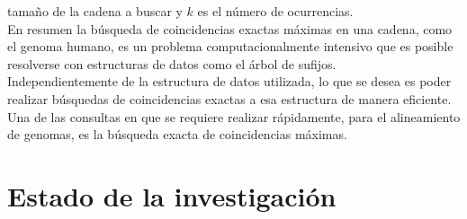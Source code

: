 \documentclass[11pt,a4paper,english]{article}
\begin{document}
tamaño de la cadena a buscar y $k$ es el número de ocurrencias.\\
En resumen la búsqueda de coincidencias exactas máximas en una cadena, como el 
genoma humano, es un problema computacionalmente intensivo que es posible 
resolverse con estructuras de datos como el árbol de sufijos. 
\\Independientemente de la estructura de datos utilizada, lo que se desea es poder
realizar búsquedas de coincidencias exactas a esa estructura de manera eficiente. 
Una de las consultas en que se requiere realizar rápidamente, para el alineamiento 
de genomas, es la búsqueda exacta de coincidencias máximas. 
\section{Estado de la investigación}
\end{document}

